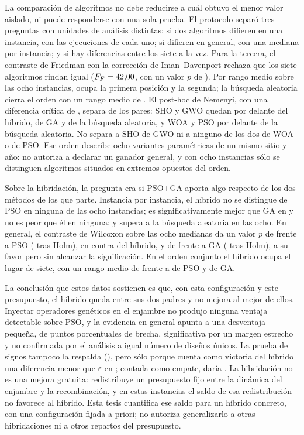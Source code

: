 La comparación de algoritmos no debe reducirse a cuál obtuvo el menor valor aislado, ni puede responderse con una sola prueba. El protocolo separó tres preguntas con unidades de análisis distintas: si dos algoritmos difieren en una instancia, con las \Replicates{} ejecuciones de cada uno; si difieren en general, con una mediana por instancia; y si hay diferencias entre los siete a la vez.
Para la tercera, el contraste de Friedman con la corrección de Iman--Davenport rechaza que los siete algoritmos rindan igual ($F_F=\text{42,00}$, con un valor $p$ de \ImanDavenportP). Por rango medio sobre las ocho instancias, \BestMeanRankAlgorithm{} ocupa la primera posición y \SecondMeanRankAlgorithm{} la segunda; la búsqueda aleatoria cierra el orden con un rango medio de \MeanRankRandom. El post-hoc de Nemenyi, con una diferencia crítica de \CriticalDifference, separa \NemenyiPairsCount{} de los \NemenyiPairsTotal{} pares: SHO y GWO quedan por delante del híbrido, de GA y de la búsqueda aleatoria, y WOA y PSO por delante de la búsqueda aleatoria. No separa a SHO de GWO ni a ninguno de los dos de WOA o de PSO. Ese orden describe ocho variantes paramétricas de un mismo sitio y año: no autoriza a declarar un ganador general, y con ocho instancias sólo se distinguen algoritmos situados en extremos opuestos del orden.

Sobre la hibridación, la pregunta era si PSO+GA aporta algo respecto de los dos métodos de los que parte. Instancia por instancia, el híbrido no se distingue de PSO en ninguna de las ocho instancias; es significativamente mejor que GA en \CtrlGaPlus{} y no es peor que él en ninguna; y supera a la búsqueda aleatoria en las ocho. En general, el contraste de Wilcoxon sobre las ocho medianas da un valor $p$ de \CtrlPsoWilcoxonP{} frente a PSO (\CtrlPsoWilcoxonHolm{} tras Holm), en contra del híbrido, y de \CtrlGaWilcoxonP{} frente a GA (\CtrlGaWilcoxonHolm{} tras Holm), a su favor pero sin alcanzar la significación. En el orden conjunto el híbrido ocupa el lugar \ControlRankPosition{} de siete, con un rango medio de \MeanRankPsoGa{} frente a \MeanRankPso{} de PSO y \MeanRankGa{} de GA.

La conclusión que estos datos sostienen es que, con esta configuración y este presupuesto, el híbrido queda entre sus dos padres y no mejora al mejor de ellos. Inyectar operadores genéticos en el enjambre no produjo ninguna ventaja detectable sobre PSO, y la evidencia en general apunta a una desventaja pequeña, de \CtrlPsoShift{} puntos porcentuales de brecha, significativa por un margen estrecho y no confirmada por el análisis a igual número de diseños únicos. La prueba de signos tampoco la respalda (\CtrlPsoSignP), pero sólo porque cuenta como victoria del híbrido una diferencia menor que $\varepsilon$ en \CtrlPsoSubTolInstances; contada como empate, daría \CtrlPsoSignTiesP. La hibridación no es una mejora gratuita: redistribuye un presupuesto fijo entre la dinámica del enjambre y la recombinación, y en estas instancias el saldo de esa redistribución no favorece al híbrido. Esta tesis cuantifica ese saldo para un híbrido concreto, con una configuración fijada a priori; no autoriza generalizarlo a otras hibridaciones ni a otros repartos del presupuesto.

